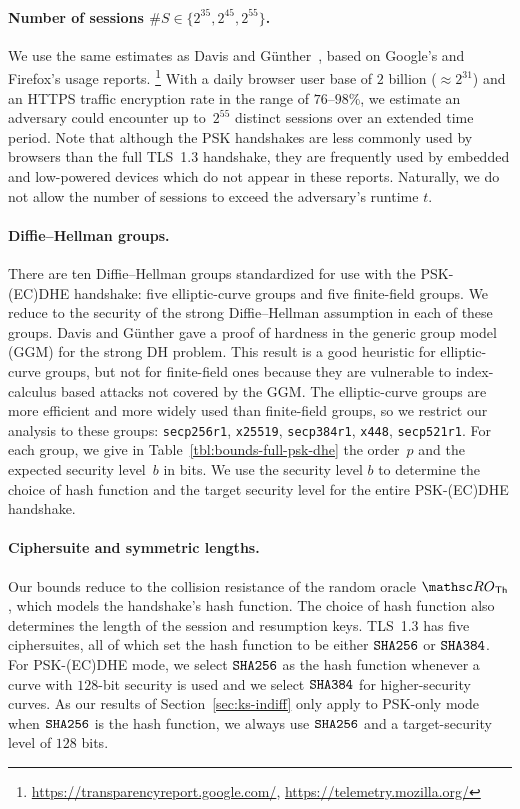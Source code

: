 \paragraph{Number of sessions $\#S \in \{2^{35}, 2^{45}, 2^{55}\}$.}
We use the same estimates as Davis and G{\"u}nther~\cite{ACNS:DavGun21}, based on Google's and Firefox's usage reports.%
\footnote{\url{https://transparencyreport.google.com/}, \url{https://telemetry.mozilla.org/}}
With a daily browser user base of $2$ billion ($\approx 2^{31}$) and an HTTPS traffic encryption rate in the range of $76$--$98\%$,
we estimate an adversary could encounter up to~$2^{55}$ distinct sessions over an extended time period.
Note that although the PSK handshakes are less commonly used by browsers than the full TLS~1.3 handshake, they are frequently used by embedded and low-powered devices which do not appear in these reports.
Naturally, we do not allow the number of sessions to exceed the adversary's runtime $t$.

\paragraph{Diffie--Hellman groups.}
There are ten Diffie--Hellman groups standardized for use with the PSK-(EC)DHE handshake: five elliptic-curve groups and five finite-field groups. 
We reduce to the security of the strong Diffie--Hellman assumption in each of these groups.
Davis and Günther gave a proof of hardness in the generic group model (GGM) for the strong DH problem.
This result is a good heuristic for elliptic-curve groups, but not for finite-field ones because they are vulnerable to index-calculus based attacks not covered by the GGM.
The elliptic-curve groups are more efficient and more widely used than finite-field groups, so we restrict our analysis to these groups:
\texttt{secp256r1}, \texttt{x25519}, \texttt{secp384r1}, \texttt{x448}, \texttt{secp521r1}.
For each group, we give in Table~\ref{tbl:bounds-full-psk-dhe} the order~$p$ and the expected security level~$b$ in bits.
We use the security level $b$ to determine the choice of hash function and the target security level for the entire PSK-(EC)DHE handshake.

\paragraph{Ciphersuite and symmetric lengths.}
Our bounds reduce to the collision resistance of the random oracle $\ROthash$, which models the handshake's hash function.
The choice of hash function also determines the length of the session and resumption keys.
TLS~1.3 has five ciphersuites, all of which set the hash function to be either $\texttt{SHA{256}}$ or $\texttt{SHA{384}}$.
For PSK-(EC)DHE mode, we select $\texttt{SHA{256}}$ as the hash function whenever a curve with $128$-bit security is used and we select $\texttt{SHA{384}}$ for higher-security curves.
As our results of Section~\ref{sec:ks-indiff} only apply to PSK-only mode when $\texttt{SHA{256}}$ is the hash function, we always use $\texttt{SHA{256}}$ and a target-security level of $128$ bits.

